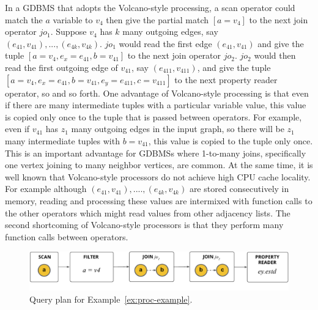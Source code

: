In a GDBMS that adopts the Volcano-style processing, a scan operator could match the $a$ variable to $v_4$ then give the partial match $[a=v_4]$ to the next join operator $jo_1$. Suppose $v_4$ has $k$ many outgoing edges, say $(e_{41}, v_{41}), ..., (e_{4k}, v_{4k})$. $jo_1$ would read the first edge $(e_{41}, v_{41})$ and give the tuple $[a=v_4, e_x=e_{41}, b=v_{41}]$ to the next join operator $jo_2$. $jo_2$ would then read the first outgoing edge of $v_{41}$, say $(e_{411}, v_{411})$, and give the tuple $[a=v_4, e_x=e_{41}, b=v_{41}, e_y=e_{411}, c=v_{411}]$ to the next property reader operator, so and so forth. One advantage of Volcano-style processing is that even if there are many intermediate tuples with a particular variable value, this value is copied only once to the tuple that is passed between operators. For example, even if $v_{41}$ has $z_1$ many outgoing edges in the input graph, so there will be $z_1$ many intermediate tuples with $b=v_{41}$, this value is copied to the tuple only once. This is an important advantage for GDBMSs where 1-to-many joins, specifically one vertex joining to many neighbor vertices, are common. At the same time, it is well known that Volcano-style processors do not achieve high CPU cache locality. For example although $(e_{41}, v_{41}), ...., (e_{4k}, v_{4k})$ are stored consecutively in memory, reading and processing these values are intermixed with function calls to the other operators which might read values from other adjacency lists. The second shortcoming of Volcano-style processors is that they perform many function calls between operators.

\vspace{-5pt}

\begin{figure}
	\begin{center}
		\includegraphics[scale=0.78]{img/proc-qp}
	\end{center}
		\caption{Query plan for Example~\ref{ex:proc-example}.}
	\label{fig:proc-qp}
\end{figure}

